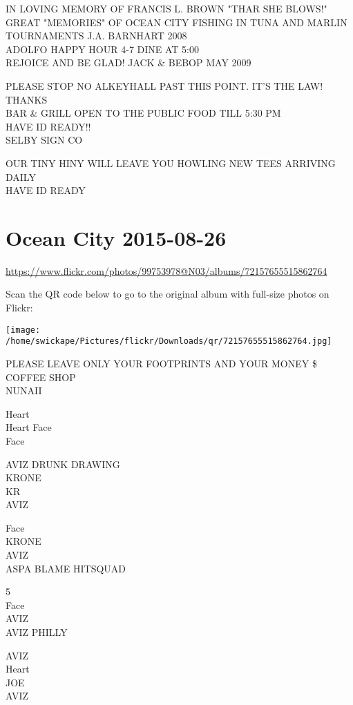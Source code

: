 \documentclass[10pt,letterpaper]{article}
\begin{document}
IN LOVING MEMORY OF FRANCIS L. BROWN "THAR SHE BLOWS!"\\
GREAT "MEMORIES" OF OCEAN CITY FISHING IN TUNA AND MARLIN TOURNAMENTS J.A. BARNHART 2008\\
ADOLFO HAPPY HOUR 4{-}7 DINE AT 5:00\\
REJOICE AND BE GLAD!  JACK \& BEBOP MAY 2009

PLEASE STOP NO ALKEYHALL PAST THIS POINT.  IT'S THE LAW!  THANKS\\
BAR \& GRILL OPEN TO THE PUBLIC FOOD TILL 5:30 PM\\
HAVE ID READY!!\\
SELBY SIGN CO

OUR TINY HINY WILL LEAVE YOU HOWLING NEW TEES ARRIVING DAILY\\
HAVE ID READY
\pagebreak

\section*{Ocean City 2015-08-26}

\url{https://www.flickr.com/photos/99753978@N03/albums/72157655515862764}

Scan the QR code below to go to the original album with full-size photos on Flickr:

\texttt{[image: /home/swickape/Pictures/flickr/Downloads/qr/72157655515862764.jpg]}
\pagebreak

PLEASE LEAVE ONLY YOUR FOOTPRINTS AND YOUR MONEY \$\\
COFFEE SHOP\\
NUNAII

Heart\\
Heart Face\\
Face

AVIZ DRUNK DRAWING\\
KRONE\\
KR\\
AVIZ

Face\\
KRONE\\
AVIZ\\
ASPA BLAME HITSQUAD

5\\
Face\\
AVIZ\\
AVIZ PHILLY

AVIZ\\
Heart\\
JOE\\
AVIZ
\end{document}
